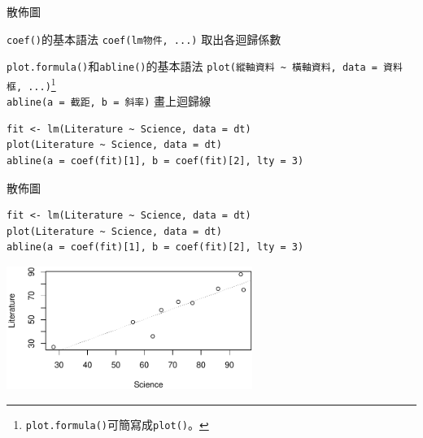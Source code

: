 \documentclass[12pt, aspectratio=43]{beamer}
\let\oldfootnote\footnote
\renewcommand\footnote[1]{\hspace{-0.3em}\oldfootnote{\ignorespaces#1}\hspace{0.3em}}
\begin{document}
\begin{frame}[fragile]{散佈圖}

\begin{block}{\texttt{coef()}的基本語法}
\verb+coef(lm物件, ...)+ 取出各迴歸係數
\end{block}

\begin{block}{\texttt{plot.formula()}和\texttt{abline()}的基本語法}
\verb+plot(縱軸資料 ~ 橫軸資料, data = 資料框, ...)+\oldfootnote{\texttt{plot.formula()}可簡寫成\texttt{plot()}。}\\
\verb+abline(a = 截距, b = 斜率)+ 畫上迴歸線
\end{block}

\begin{verbatim}
fit <- lm(Literature ~ Science, data = dt)
plot(Literature ~ Science, data = dt)
abline(a = coef(fit)[1], b = coef(fit)[2], lty = 3)
\end{verbatim}
\end{frame}

\begin{frame}[fragile]{散佈圖}

\begin{verbatim}
fit <- lm(Literature ~ Science, data = dt)
plot(Literature ~ Science, data = dt)
abline(a = coef(fit)[1], b = coef(fit)[2], lty = 3)
\end{verbatim}

\begin{center}
\includegraphics[width=0.6\textwidth]{Rplot-sct.pdf}
\end{center}
\end{frame}

%




\end{document}
